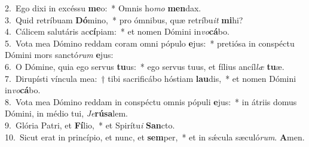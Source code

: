 {2.~}Ego dixi in excéssu \textbf{me}o:~* Omnis ho\textit{mo} \textbf{men}dax.\\
{3.~}Quid retríbuam \textbf{Dó}mino,~* pro ómnibus, quæ retríbu\textit{it} \textbf{mi}hi?\\
{4.~}Cálicem salutáris ac\textbf{cí}piam:~* et nomen Dómini in\textit{vo}\textbf{cá}bo.\\
{5.~}Vota mea Dómino reddam coram omni pópulo \textbf{e}jus:~* pretiósa in conspéctu Dómini mors sanctó\textit{rum} \textbf{e}jus:\\
{6.~}O Dómine, quia ego servus \textbf{tu}us:~* ego servus tuus, et fílius ancíl\textit{læ} \textbf{tu}æ.\\
{7.~}Dirupísti víncula mea:~† tibi sacrificábo hóstiam \textbf{lau}dis,~* et nomen Dómini in\textit{vo}\textbf{cá}bo.\\
{8.~}Vota mea Dómino reddam in conspéctu omnis pópuli \textbf{e}jus:~* in átriis domus Dómini, in médio tui, \textit{Je}\textbf{rú}\textbf{sa}lem.\\
{9.~}Glória Patri, et \textbf{Fí}lio,~* et Spirítu\textit{i} \textbf{San}cto.\\
{10.~}Sicut erat in princípio, et nunc, et \textbf{sem}per,~* et in sǽcula sæculó\textit{rum}. \textbf{A}men.\\
